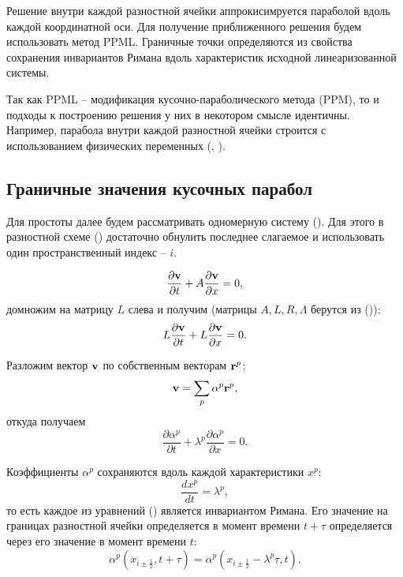 \documentclass[12pt,a4paper]{article}
\newcommand{\half}{\frac{1}{2}}
\newcommand{\dpartial}[2]{\dfrac{ \partial #1 }{ \partial #2 }}
\begin{document}
    Решение внутри каждой разностной ячейки аппрокисимруется параболой вдоль каждой координатной оси. Для получение приближенного решения будем использовать метод PPML. Граничные точки определяются из свойства сохранения инвариантов Римана вдоль характеристик исходной линеаризованной системы.

    Так как PPML -- модификация кусочно-параболического метода (PPM), то и подходы к построению решения у них в некотором смысле идентичны. Например, парабола внутри каждой разностной ячейки строится с использованием физических переменных (, ).

    \subsection{Граничные значения кусочных парабол}

    Для простоты далее будем рассматривать одномерную систему (). Для этого в разностной схеме () достаточно обнулить последнее слагаемое и использовать один пространственный индекс -- $ i $. 

    \[
        \dpartial{\bold v}{t} + A\dpartial{\bold v}{x} = 0,  
    \]
    \noindent домножим на матрицу $L$ слева и получим (матрицы $A, L, R, \Lambda$ берутся из ()):
    \[
        L\dpartial{\bold v}{t} + \Lambda L \dpartial{\bold v}{x} = 0.
    \]

    Разложим вектор $ \bold v $ по собственным векторам $ \bold r^p \colon$
    \begin{equation}
        \label{eq:eigen}
        \bold v = \sum_p \alpha^p \bold r^p,
    \end{equation}
    \noindent откуда получаем
    \begin{equation}
        \label{system:eigen}
        \dpartial{\alpha^p}{t} + \lambda^p \dpartial{\alpha^p}{x} = 0.  
    \end{equation}

    Коэффициенты $ \alpha^p $ сохраняются вдоль каждой характеристики $ x^p \colon$
    \[
        \dfrac{d x^p}{dt} = \lambda^p,  
    \]
    \noindent то есть каждое из уравнений () является инвариантом Римана. Его значение на границах разностной ячейки определяется в момент времени $t + \tau$ определяется через его значение в момент времени $t\colon$
    \begin{equation}
        \label{shift:1d}
        \alpha^p(x_{i \pm \half}, t + \tau) = \alpha^p(x_{i \pm \half} - \lambda^p \tau, t).
    \end{equation}
\end{document}
